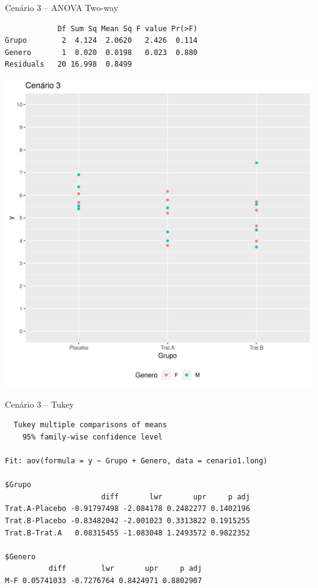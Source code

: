 \documentclass{beamer}
\begin{document}
\begin{frame}[fragile]
  \begin{exampleblock}{Cenário 3 -- ANOVA Two-way}
    \tiny
\begin{verbatim}
            Df Sum Sq Mean Sq F value Pr(>F)
Grupo        2  4.124  2.0620   2.426  0.114
Genero       1  0.020  0.0198   0.023  0.880
Residuals   20 16.998  0.8499
\end{verbatim}
    \begin{center}
      \includegraphics[height=.5\textheight]{Cap13-30/cenario12}
    \end{center}
  \end{exampleblock}
\end{frame}

\begin{frame}[fragile]
  \begin{exampleblock}{Cenário 3 -- Tukey}
    \tiny
\begin{verbatim}
  Tukey multiple comparisons of means
    95% family-wise confidence level

Fit: aov(formula = y ~ Grupo + Genero, data = cenario1.long)

$Grupo
                      diff       lwr       upr     p adj
Trat.A-Placebo -0.91797498 -2.084178 0.2482277 0.1402196
Trat.B-Placebo -0.83482042 -2.001023 0.3313822 0.1915255
Trat.B-Trat.A   0.08315455 -1.083048 1.2493572 0.9822352

$Genero
          diff        lwr       upr     p adj
M-F 0.05741033 -0.7276764 0.8424971 0.8802907
\end{verbatim}
  \end{exampleblock}
\end{frame}
\end{document}
